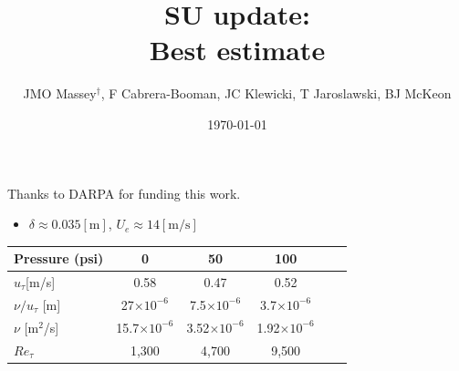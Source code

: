 \documentclass[aspectratio=169,9pt]{beamer}
\title{SU update: \\ Best estimate}
\author{JMO Massey$^{\dag}$, F Cabrera-Booman, JC Klewicki, T Jaroslawski, BJ McKeon}
\institute{Center for Turbulence Research \\ Stanford University}
\date{\today}
\begin{document}
\begin{frame}
    \setcounter{framenumber}{0}
    \titlepage
    \vfill
    {\scriptsize \centering Thanks to DARPA for funding this work.\par}
\end{frame}

\begin{frame}

    \begin{itemize}
        \item $\delta\approx 0.035[\mathrm{m}]$, $U_e \approx14[\mathrm{m/s}]$
    \end{itemize}
    \begin{table}[]
        \centering
        \begin{tabular}{lccccc}
        \toprule
        Pressure (psi) & 0  &  50 & 100 \\
        \midrule
        $u_\tau$[m/s] & 0.58 & 0.47 & 0.52 \\
        $\nu/u_\tau$ [m] & 27$\times 10^{-6}$ & 7.5$\times 10^{-6}$ & 3.7$\times 10^{-6}$ \\
        $\nu$ [m$^2$/s] & 15.7$\times 10^{-6}$ & 3.52$\times 10^{-6}$ & 1.92$\times 10^{-6}$ \\
        $Re_\tau$ & 1,300 & 4,700 & 9,500 \\
        \bottomrule
        \end{tabular}
    \end{table}

\end{frame}


\end{document}
